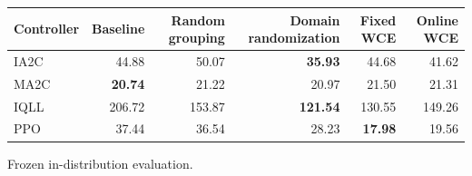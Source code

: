 \begin{tabular}{lrrrrr}
\hline
Controller & Baseline & Random grouping & Domain randomization & Fixed WCE & Online WCE \\
\hline
IA2C & 44.88 & 50.07 & \textbf{35.93} & 44.68 & 41.62 \\
MA2C & \textbf{20.74} & 21.22 & 20.97 & 21.50 & 21.31 \\
IQLL & 206.72 & 153.87 & \textbf{121.54} & 130.55 & 149.26 \\
PPO & 37.44 & 36.54 & 28.23 & \textbf{17.98} & 19.56 \\
\hline
\end{tabular}
Frozen in-distribution evaluation.
